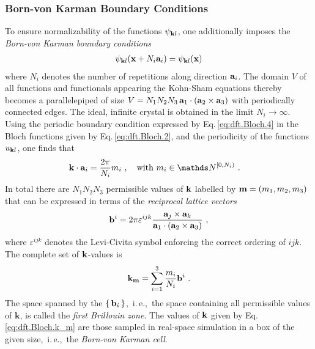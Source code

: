\documentclass[a4paper,12pt]{book}
\renewcommand{\b}[1]{\boldsymbol{#1}}
\newcommand{\im}{{\rm i}}
\begin{document}
\subsubsection{Born-von Karman Boundary Conditions}
To ensure normalizability of the functions $\psi_{{\bf k}l}$, one additionally imposes the \emph{Born-von Karman boundary conditions}
\begin{align}
	\psi_{{\bf k}l} ({\bf x} + N_i {\bf a}_i) 
		= \psi_{{\bf k}l} ({\bf x})
	\label{eq:dft.Bloch.4}
\end{align}
where $N_i$ denotes the number of repetitions along direction ${\bf a}_i$. The domain $V$ of all functions and functionals appearing the Kohn-Sham equations thereby becomes a parallelepiped of size 
$V = N_1 N_2 N_3 \, {\bf a}_1 \cdot ({\bf a}_2 \times {\bf a}_3)$ with periodically connected edges. The ideal, infinite crystal is obtained in the limit $N_i \rightarrow \infty$.
Using the periodic boundary condition expressed by Eq.\,\eqref{eq:dft.Bloch.4} in the Bloch functions given by Eq.\,\eqref{eq:dft.Bloch.2}, and the periodicity of the functions $u_{{\bf k} l}$, one finds that
\begin{align}
		{\bf k} \cdot {\bf a}_i
			&= \frac{2 \pi}{N_i} m_i~,\quad\text{with } m_i \in \mathds N^{[0, N_i)}~.
	\label{eq:dft.Bloch.5}
\end{align}
In total there are $N_1 N_2 N_3$ permissible values of $\bf k$ labelled by ${\bf m} = (m_1, m_2, m_3)$ that can be expressed in terms of the \emph{reciprocal lattice vectors}~\cite{Sands2002}
\begin{align}
	{\bf b}^i 
		= 2 \pi \varepsilon^{ijk} \frac{{\bf a}_j \times {\bf a}_k}{{\bf a}_1 \cdot ({\bf a}_2 \times {\bf a}_3)} ~,
	\label{eq:dft.Bloch.bi}
\end{align}
where $\varepsilon^{ijk}$ denotes the Levi-Civita symbol enforcing the correct ordering of $ijk$. The complete set of $\bf k$-values is
\begin{align}
	{\bf k}_{\bf m} 
		= \sum_{i=1}^3 \frac{m_i}{N_i} {\bf b}^i~.
	\label{eq:dft.Bloch.k_m}
\end{align}
The space spanned by the $\set{{\bf b}_i}$,~i.\,e.,~the space containing all permissible values of $\b k$, is called the \emph{first Brillouin zone}. The values of $\bf k$ given by Eq.\,\eqref{eq:dft.Bloch.k_m} are those sampled in real-space simulation in a box of the given size,~i.\,e.,~the \emph{Born-von Karman cell}.
\end{document}
